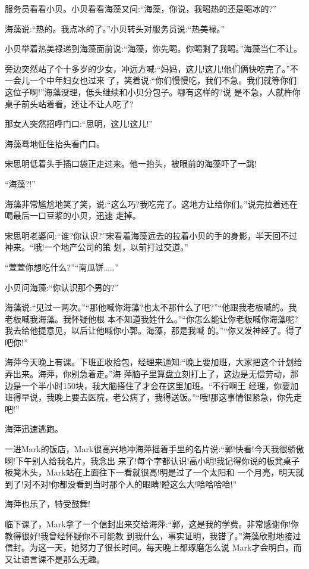 \documentclass[11pt,a4paper,onecolumn]{article}
\begin{document}
服务员看看小贝。小贝看看海藻又问:``海藻，你说，我喝热的还是喝冰的?''

海藻说:``热的。我点冰的了。''小贝转头对服务员说:``热美禄。''

小贝举着热美禄递到海藻面前说:``海藻，你先喝。你喝剩了我喝。''海藻当仁不让。

旁边突然站了个十多岁的少女，冲远方喊:``妈妈，这儿!这儿!他们俩快吃完了。''不一会儿一个中年妇女也过来
了，笑着说:``你们慢慢吃，我们不急。我们就等你们这位子啊!''海藻没理，低头继续和小贝分包子。哪有这样的?说
是不急，人就杵你桌子前头站着看，还让不让人吃了?

那女人突然招呼门口:``思明，这儿!这儿!''

海藻蓦地怔住抬头看门口。

宋思明低着头手插口袋正走过来。他一抬头，被眼前的海藻吓了一跳!

``海藻?!''

海藻非常尴尬地笑了笑，说:``这么巧?我吃完了。这地方让给你们。''说完拉着还在喝最后一口豆浆的小贝，迅速
走掉。

宋思明老婆问:``谁?你认识?''宋看着海藻远去的拉着小贝的手的身影，半天回不过神来。``哦!一个地产公司的策
划，以前打过交道。''

``萱萱你想吃什么?''``南瓜饼……''

小贝问海藻:``你认识那个男的?''

海藻说:``见过一两次。''``那他喊你海藻?也太不那什么了吧?''``他跟我老板喊的。我老板喊我海藻。我怀疑他根
本不知道我姓什么。''``你怎么能让你老板喊你海藻呢?我去给他提意见，以后让他喊你小郭。海藻，那是我喊
的。''``你又发神经了。得了吧你!''

海萍今天晚上有课。下班正收拾包，经理来通知:``晚上要加班，大家把这个计划给弄出来。海萍，你别急着走。''海
萍脑子里算盘立刻打上了，这边是无偿劳动，那边是一个半小时150块，我大脑搭住了才会在这里加班。``不行啊王
经理，你要加班得早说，我晚上要去医院，老公病了，我得送饭。''``哦!那这事情很紧急，你先走吧!''

海萍迅速逃跑。

一进Mark的饭店，Mark很高兴地冲海萍摇着手里的名片说:``郭!快看!今天我很骄傲啊!下午别人给我名片，我念出
来了!每个字都认识!高小明!我记得你说的板凳桌子板凳木头，Mark站在上面往下一看就很高!明是过了一个太阳和
一个月亮，明天就到了!对不对!你都没看到当时那个人的眼睛!瞪这么大!哈哈哈哈!''

海萍也乐了，特受鼓舞!

临下课了，Mark拿了一个信封出来交给海萍:``郭，这是我的学费。非常感谢你!你教得很好!我曾经怀疑你不可能教
到我什么，事实证明，我错了。''海藻欣慰地接过信封。为这一天，她努力了很长时间。每天晚上都琢磨怎么说
Mark才会明白，而又让语言课不是那么无趣。
\end{document}
